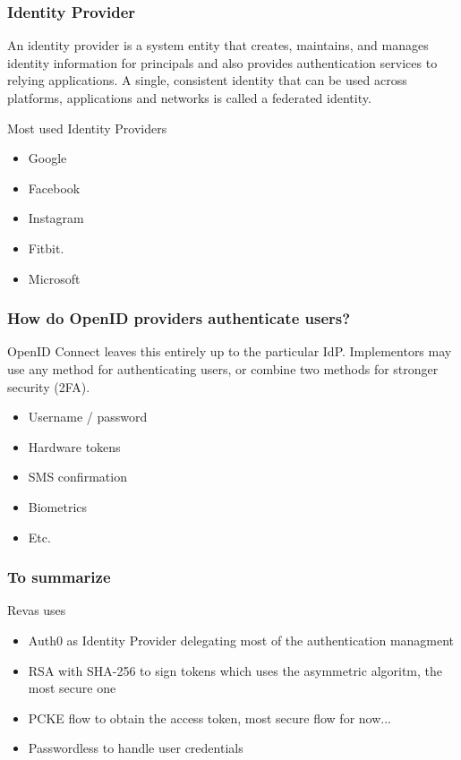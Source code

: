 \documentclass{beamer}
\begin{document}
\begin{frame}
	\frametitle{Identity Provider}
	An identity provider is a system entity that creates, maintains, and manages identity information for principals and also provides authentication services to relying applications. \newline
	A single, consistent identity that can be used across platforms, applications and networks is called a federated identity. 
	
	Most used Identity Providers
	\begin{itemize}	
		\item Google
		\item Facebook
		\item Instagram
		\item Fitbit.
		\item Microsoft
\end{itemize}	
	
\end{frame}

\begin{frame}
	\frametitle{How do OpenID providers authenticate users?}
	
	OpenID Connect leaves this entirely up to the particular IdP. Implementors may use any method for authenticating users, or combine two methods for stronger security (2FA).
	\begin{itemize}	
 		\item Username / password
		 \item Hardware tokens
		 \item SMS confirmation
		 \item Biometrics
		 \item Etc.
	\end{itemize}
\end{frame}

\begin{frame}
 \frametitle{To summarize}
 
 Revas uses
 \begin{itemize} 
   \item Auth0 as Identity Provider delegating most of the authentication managment
   \item RSA with SHA-256 to sign tokens which uses the asymmetric algoritm, the most secure one
   \item PCKE flow to obtain the access token, most secure flow for now...
   \item Passwordless to handle user credentials
 \end{itemize}
\end{frame}
\end{document}
